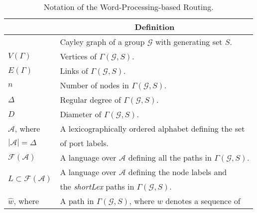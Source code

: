 \begin{table}[t!]
\centering
\caption{Notation of the Word-Processing-based Routing.}
	\label{tb:notation}
\begin{tabular}[center]{|l|l|}
\hline
\rowcolor{gray!30}\multicolumn{1}{c|}{\multirow{1}{*}{\textbf{Parameter}}}&\multicolumn{1}{c|}{\multirow{1}{*}{\textbf{Definition}}}\\
\hline\noalign{\smallskip}
\hline
\multirow{1}{*}{$\Gamma(\mathcal{G},S)$}   &\multirow{1}{*}{Cayley graph of a  group $\mathcal{G}$ with generating set $S$.}\\
\hline
\multirow{1}{*}{$V(\Gamma)$}   &\multirow{1}{*}{Vertices of $\Gamma(\mathcal{G},S)$.}\\
\hline
\multirow{1}{*}{$E(\Gamma)$}  &\multirow{1}{*}{Links of $\Gamma(\mathcal{G},S)$.}\\
\hline
\multirow{1}{*}{$n$}   &\multirow{1}{*}{Number of nodes in $\Gamma(\mathcal{G},S)$.}\\
\hline
\multirow{1}{*}{$\Delta$}   &\multirow{1}{*}{Regular degree of $\Gamma(\mathcal{G},S)$.}\\
\hline
\multirow{1}{*}{$D$}   &\multirow{1}{*}{Diameter of $\Gamma(\mathcal{G},S)$.}\\
\hline
\multirow{1}{*}{$\mathcal{A}$, where}   &\multirow{1}{*}{A lexicographically ordered alphabet defining the set}\\
\multirow{1}{*}{$|\mathcal{A}|=\Delta$}   &\multirow{1}{*}{of port labels.}\\
\hline
\multirow{1}{*}{$\mathcal{F(\mathcal{A})}$}   &\multirow{1}{*}{A language over $\mathcal{A}$ defining all the paths in $\Gamma(\mathcal{G},S)$.}\\
\hline
\multirow{2}{*}{$L\subset\mathcal{F(\mathcal{A})}$}   &\multirow{1}{*}{A language over $\mathcal{A}$ defining the node labels and}\\
\multirow{1}{*}{}   &\multirow{1}{*}{the \textit{shortLex} paths in $\Gamma(\mathcal{G},S)$.}\\
\hline
\multirow{1}{*}{$\widehat{w}$, where}   &\multirow{1}{*}{A path in $\Gamma(\mathcal{G},S)$, where $w$  denotes a sequence of}\\

\end{tabular}
\end{table}
